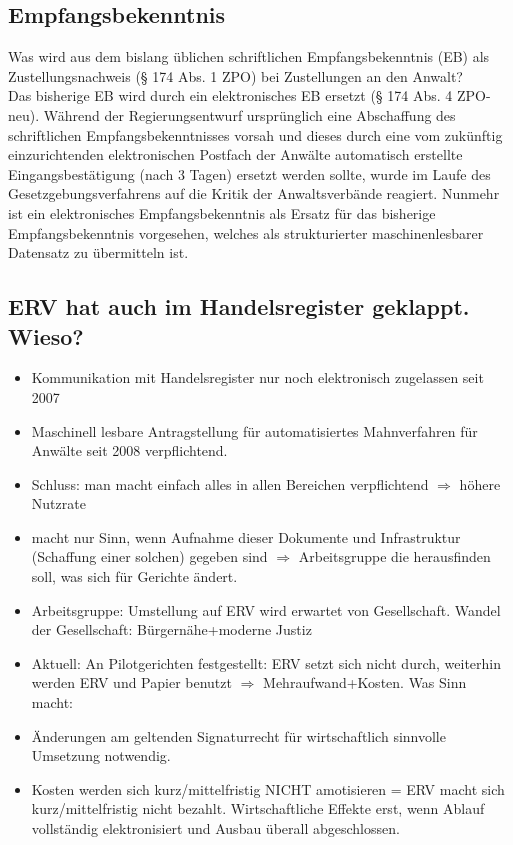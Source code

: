 \subsection{Empfangsbekenntnis}
Was wird aus dem bislang üblichen schriftlichen Empfangsbekenntnis (EB) als Zustellungsnachweis (§ 174 Abs. 1 ZPO) bei Zustellungen an den Anwalt? \\
Das bisherige EB wird durch ein elektronisches EB ersetzt (§ 174 Abs. 4 ZPO-neu). Während der Regierungsentwurf ursprünglich eine Abschaffung des schriftlichen Empfangsbekenntnisses vorsah und dieses durch eine vom zukünftig einzurichtenden elektronischen Postfach der Anwälte automatisch erstellte Eingangsbestätigung (nach 3 Tagen) ersetzt werden sollte, wurde im Laufe des Gesetzgebungsverfahrens auf die Kritik der Anwaltsverbände reagiert. Nunmehr ist ein elektronisches Empfangsbekenntnis als Ersatz für das bisherige Empfangsbekenntnis vorgesehen, welches als strukturierter maschinenlesbarer Datensatz zu übermitteln ist.

\subsection{ERV hat auch im Handelsregister geklappt. Wieso?}
\begin{itemize}
\item Kommunikation mit Handelsregister nur noch elektronisch zugelassen seit 2007
\item Maschinell lesbare Antragstellung für automatisiertes Mahnverfahren für Anwälte seit 2008 verpflichtend.
\item Schluss: man macht einfach alles in allen Bereichen verpflichtend $\Rightarrow$ höhere Nutzrate
\item macht nur Sinn, wenn Aufnahme dieser Dokumente und Infrastruktur (Schaffung einer solchen) gegeben sind $\Rightarrow$ Arbeitsgruppe die herausfinden soll, was sich für Gerichte ändert. 
\item Arbeitsgruppe: Umstellung auf ERV wird erwartet von Gesellschaft. Wandel der Gesellschaft: Bürgernähe+moderne Justiz
\item Aktuell: An Pilotgerichten festgestellt: ERV setzt sich nicht durch, weiterhin werden ERV und Papier benutzt $\Rightarrow$ Mehraufwand+Kosten. Was Sinn macht: 
\item Änderungen am geltenden Signaturrecht für wirtschaftlich sinnvolle Umsetzung notwendig.
\item Kosten werden sich kurz/mittelfristig NICHT amotisieren = ERV macht sich kurz/mittelfristig nicht bezahlt. Wirtschaftliche Effekte erst, wenn Ablauf vollständig elektronisiert und Ausbau überall abgeschlossen.
\end{itemize}

